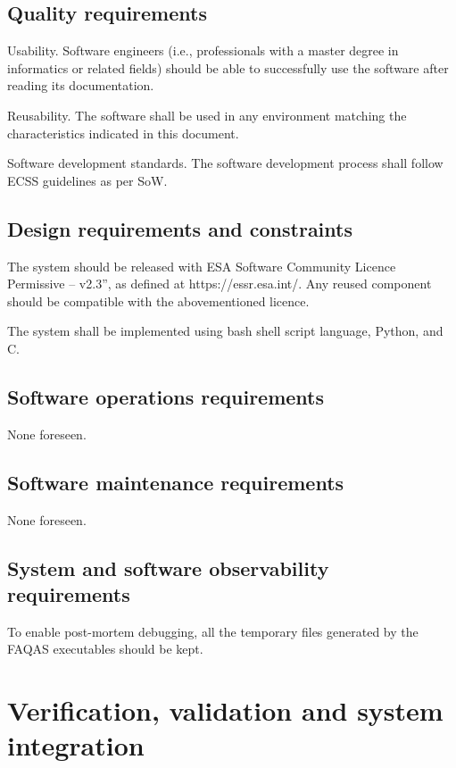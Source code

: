 \subsection{Quality requirements}

\RQ{} Usability. Software engineers (i.e., professionals with a master degree in informatics or related fields) should be able to successfully use the software after reading its documentation.

\RQ{} Reusability. The software shall be used in any environment matching the characteristics indicated in this document.

\RQ{} Software development standards. The software development process shall follow ECSS guidelines as per SoW.

\subsection{Design requirements and constraints}

\RQ{} The system should be released with ESA Software Community Licence Permissive – v2.3”, as defined at https://essr.esa.int/. Any reused component should be compatible with the abovementioned licence.

\RQ{} The system shall be implemented using bash shell script language, Python, and C.

\subsection{Software operations requirements}

None foreseen.

\subsection{Software maintenance requirements}

None foreseen.

\subsection{System and software observability requirements}

\RQ{} To enable post-mortem debugging, all the temporary files generated by the FAQAS executables should be kept.

\section{Verification, validation and system integration}
